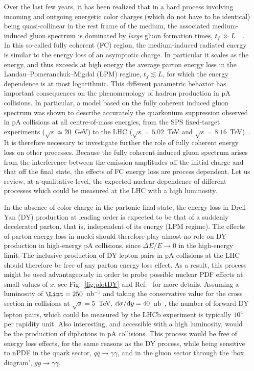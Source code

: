 \documentclass[../report.tex]{subfiles}
\begin{document}
Over the last few years, it has been realized that in a hard process involving incoming and outgoing energetic color charges (which do not have to be identical) being quasi-collinear in the rest frame of the medium, the associated medium-induced gluon spectrum is dominated by {\it large} gluon formation times, $t_f \gg L$~~\cite{Arleo:2010rb,Peigne:2014rka,Peigne:2014uha}. In this so-called fully coherent (FC) region, the medium-induced radiated energy is similar to the energy loss of an asymptotic charge. In particular it scales as the energy, and thus exceeds at high energy the average parton energy loss in the Landau--Pomeranchuk--Migdal (LPM) regime, $t_f \lesssim L$, for which the energy dependence is at most logarithmic.
%
This different parametric behavior has important consequences on the phenomenology of hadron production in pA collisions. In particular, a model based on the fully coherent induced gluon spectrum was shown to describe accurately the quarkonium suppression observed in pA collisions at all centre-of-mass energies, from the SPS fixed-target experiments ($\sqrt{s}\simeq 20$~GeV) to the LHC ($\sqrt{s}=5.02$~TeV and $\sqrt{s}=8.16$~TeV)~\cite{Arleo:2012hn,Arleo:2012rs,Arleo:2013zua}. It is therefore necessary to investigate further the role of fully coherent energy loss on other processes.
%
Because the fully coherent induced gluon spectrum arises from the interference between the emission amplitudes off the initial charge and that off the final state, the effects of FC energy loss are process dependent. Let us review, at a qualitative level, the expected nuclear dependence of different processes which could be measured at the LHC with a high luminosity.

In the absence of color charge in the partonic final state, the energy loss in Drell-Yan (DY) production at leading order is expected to be that of a suddenly decelerated parton, that is, independent of its energy (LPM regime). The effects of parton energy loss in nuclei should therefore play almost no role on DY production in high-energy pA collisions, since $\Delta E / E \to 0$ in the high-energy limit. The inclusive production of DY lepton pairs in pA collisions at the LHC should therefore be free of any parton energy loss effect. As a result, this process might be used advantageously in order to probe possible nuclear PDF effects at small values of $x$, see \eg Fig.~\ref{fig:plotDY} and Ref.~\cite{Arleo:2015qiv} for more details. Assuming a luminosity of $\Lint=250$~nb$^{-1}$ and taking the conservative value for the cross section in \pPb collisions at $\sqrt{s}=5$~TeV, ${\rm \mathrm{d} }\sigma/\mathrm{d} y=40$~nb~\cite{Arleo:2015qiv}, the number of forward DY lepton pairs, which could be measured by the LHCb experiment is typically $10^4$ per rapidity unit. Also interesting, and accessible with a high luminosity, would be the production of diphotons in pA collisions. This process would be free of energy loss effects, for the same reasons as the DY process, while being sensitive to nPDF in the quark sector, $q\bar{q} \to \gamma\gamma$, and in the gluon sector through the `box diagram', $gg \to \gamma\gamma$.
\end{document}
